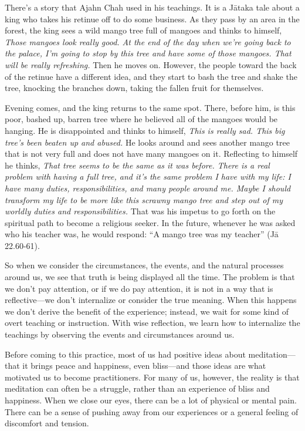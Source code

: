 There's a story that Ajahn Chah used in his teachings. It is a Jātaka 
tale about a king who takes his retinue off to do some business. As 
they pass by an area in the forest, the king sees a wild mango tree 
full of mangoes and thinks to himself, \emph{Those mangoes look really 
good. At the end of the day when we're going back to the palace, I'm 
going to stop by this tree and have some of those mangoes. That will be 
really refreshing.} Then he moves on. However, the people toward the 
back of the retinue have a different idea, and they start to bash the 
tree and shake the tree, knocking the branches down, taking the fallen 
fruit for themselves.

Evening comes, and the king returns to the same spot. There, before 
him, is this poor, bashed up, barren tree where he believed all of the 
mangoes would be hanging. He is disappointed and thinks to himself, 
\emph{This is really sad. This big tree's been beaten up and abused.} 
He looks around and sees another mango tree that is not very full and 
does not have many mangoes on it. Reflecting to himself he thinks, 
\emph{That tree seems to be the same as it was before. There is a real 
problem with having a full tree, and it's the same problem I have with 
my life: I have many duties, responsibilities, and many people around 
me. Maybe I should transform my life to be more like this scrawny mango 
tree and step out of my worldly duties and responsibilities.} That was 
his impetus to go forth on the spiritual path to become a religious 
seeker. In the future, whenever he was asked who his teacher was, he 
would respond: ``A mango tree was my teacher'' (Jā 22.60-61).

So when we consider the circumstances, the events, and the natural 
processes around us, we see that truth is being displayed all the time. 
The problem is that we don't pay attention, or if we do pay attention, 
it is not in a way that is reflective---we don't internalize or 
consider the true meaning. When this happens we don't derive the 
benefit of the experience; instead, we wait for some kind of overt 
teaching or instruction. With wise reflection, we learn how to 
internalize the teachings by observing the events and circumstances 
around us.


Before coming to this practice, most of us had positive ideas about 
meditation---that it brings peace and happiness, even bliss---and those 
ideas are what motivated us to become practitioners. For many of us, 
however, the reality is that meditation can often be a struggle, rather 
than an experience of bliss and happiness. When we close our eyes, 
there can be a lot of physical or mental pain. There can be a sense of 
pushing away from our experiences or a general feeling of discomfort 
and tension.

